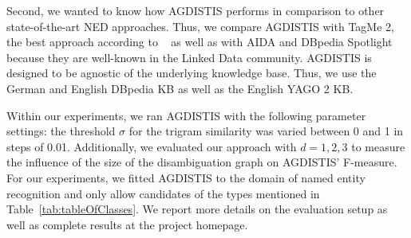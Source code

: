Second, we wanted to know how AGDISTIS performs in comparison to other state-of-the-art \ac{NED} approaches. 
Thus, we compare AGDISTIS with TagMe 2, the best approach according to ~\cite{cornEolti} as well as with AIDA and DBpedia Spotlight because they are well-known in the Linked Data community. 
AGDISTIS is designed to be agnostic of the underlying knowledge base.
Thus, we use the German and English DBpedia \ac{KB} as well as the English YAGO 2 \ac{KB}. %

Within our experiments, we ran AGDISTIS with the following parameter settings: 
the threshold $\sigma$ for the trigram similarity was varied between 0 and 1 in steps of 0.01. 
Additionally, we evaluated our approach with $d=1,2,3$ to measure the influence of the size of the disambiguation graph on AGDISTIS' F-measure.
For our experiments, we fitted AGDISTIS to the domain of named entity recognition and only allow candidates of the types mentioned in Table~\ref{tab:tableOfClasses}.
We report more details on the evaluation setup as well as complete results at the project homepage.

